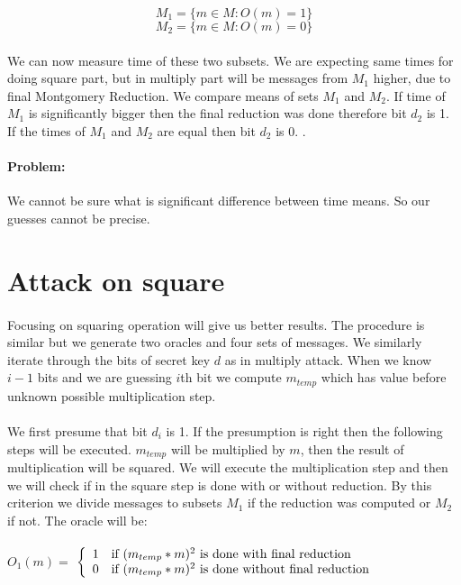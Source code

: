 \documentclass[thesis=B,english]{FITthesis}[2012/10/20]
\begin{document}
{\[M_1 = \{m \in M : O(m) = 1\}\]
\[M_2 = \{m \in M : O(m) = 0\}\]

\paragraph*{}{
We can now measure time of these two subsets. We are expecting same times for doing square part, but in multiply part will be messages from \(M_1\) higher, due to
final Montgomery Reduction. We compare means of sets \(M_1\) and \(M_2\). If time of \(M_1\) is significantly bigger then the final reduction was done therefore bit \(d_2\)
is 1. If the times of \(M_1\) and \(M_2\) are equal then bit \(d_2\) is 0. . }

\paragraph*{Problem:}{
We cannot be sure what is significant difference between time means. So our guesses cannot be precise.}

\section{Attack on square}
\paragraph*{}{
Focusing on squaring operation will give us better results. The procedure is similar but we generate two oracles and four sets of messages. We similarly iterate
through the bits of secret key \(d\) as in multiply attack. When we know \( i - 1 \) bits and we are guessing \(i\)th bit we compute \(m_{temp}\) 
which has value before unknown possible multiplication step.\cite{Dhem}
}
\paragraph*{}{
We first presume that bit \(d_i\) is 1. If the presumption is right then the following steps will be executed. \(m_{temp}\) will be multiplied by \(m\), 
then the result of multiplication will be squared. We will execute the multiplication step and then we will check if in the square step is done with or without reduction.
By this criterion we divide messages to subsets \(M_1\) if the reduction was computed or \(M_2\) if not. The oracle will be:
}
\paragraph*{}
\( O_1(m) =\) $\left\{
  \begin{array}{cl}
    \text{1} & \text{\mbox{if}  \((m_{temp} * m)^2\) is done with final reduction} \\
    \text{0} & \text{\mbox{if}  \((m_{temp} * m)^2\) is done without final reduction} 
  \end{array}
\right.$
}
\end{document}
